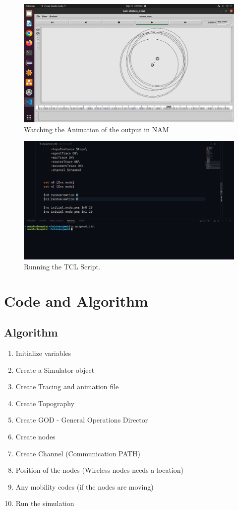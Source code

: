 \documentclass[11pt]{article}
\begin{document}
\begin{figure}[H]
    \centering
    \includegraphics[width=.95\textwidth]{../../Programs/Assignment 2/Screenshots/4.jpeg}
    \caption{Watching the Animation of the output in NAM}
\end{figure}

\begin{figure}[H]
    \centering
    \includegraphics[width=.95\textwidth]{../../Programs/Assignment 2/Screenshots/6.jpeg}
    \caption{Running the TCL Script. }
\end{figure}



\section{Code and Algorithm}
\subsection{Algorithm}
\begin{enumerate}
    \item Initialize variables
    \item Create a Simulator object
    \item Create Tracing and animation file
    \item Create Topography
    \item Create GOD - General Operations Director
    \item Create nodes
    \item Create Channel (Communication PATH)
    \item Position of the nodes (Wireless nodes needs a location)
    \item Any mobility codes (if the nodes are moving)
    \item Run the simulation
\end{enumerate}
\end{document}
